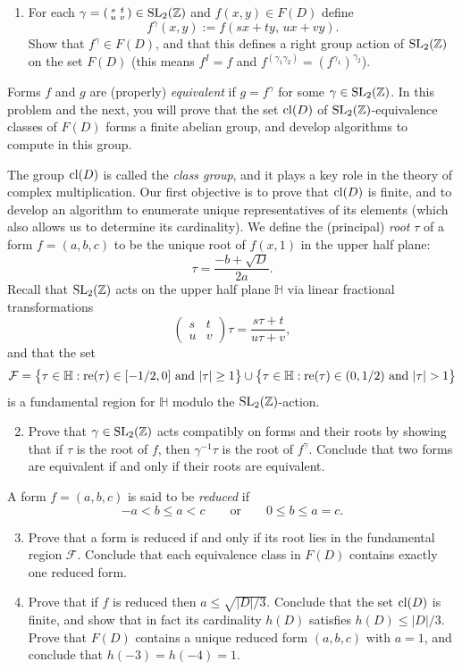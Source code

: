 \documentclass[11pt]{article}
\renewcommand{\H}{\mathbb{H}}
\newcommand{\Z}{\mathbb{Z}}
\newcommand{\re}{\operatorname{re}}
\newcommand{\SL}{{\rm SL}}
\newcommand{\cl}{{\rm cl}}
\theoremstyle{definition}
\begin{document}
\begin{enumerate}[{\bf(a)}]
\item For each $\gamma = \left(\begin{smallmatrix}s&t\\u&v\end{smallmatrix}\right)\in \SL_2(\Z)$ and $f(x,y)\in F(D)$ define
\[
f^\gamma(x,y) := f(sx+ty,\,ux+vy).
\]
Show that $f^\gamma\in F(D)$, and that this defines a right group action of $\SL_2(\Z)$ on the set $F(D)$ (this means $f^I=f$ and $f^{(\gamma_1\gamma_2)}=(f^{\gamma_1})^{\gamma_2}$).
\end{enumerate}

Forms $f$ and $g$ are (properly) \emph{equivalent} if $g=f^\gamma$ for some $\gamma\in\SL_2(\Z)$.
In this problem and the next, you will prove that the set $\cl(D)$ of $\SL_2(\Z)$-equivalence classes of $F(D)$ forms a finite abelian group, and develop algorithms to compute in this group.

The group $\cl(D)$ is called the \emph{class group}, and it plays a key role in the theory of complex multiplication.
Our first objective is to prove that $\cl(D)$ is finite, and to develop an algorithm to enumerate unique representatives of its elements (which also allows us to determine its cardinality).
We define the (principal) \emph{root} $\tau$ of a form $f=(a,b,c)$ to be the unique root of $f(x,1)$ in the upper half plane:
\[
\tau=\frac{-b+\sqrt{D}}{2a}.
\]
Recall that $\SL_2(\Z)$ acts on the upper half plane $\H$ via linear fractional transformations
\[
\begin{pmatrix}s&t\\u&v\end{pmatrix}\tau= \frac{s\tau+t}{u\tau+v},
\]
and that the set
\[
\mathcal{F}=\bigl\{\tau\in\H: \re(\tau)\in[-1/2,0] \text{ and } |\tau|\ge 1\bigr\} \\\cup \bigl\{\tau\in\H: \re(\tau)\in(0,1/2) \text{ and } |\tau|> 1\bigr\}
\]
is a fundamental region for $\H$ modulo the $\SL_2(\Z)$-action.
\begin{enumerate}[{\bf(a)}]
\setcounter{enumi}{1}
\item Prove that $\gamma\in\SL_2(\Z)$ acts compatibly on forms and their roots by showing that if $\tau$ is the root of $f$, then $\gamma^{-1}\tau$ is the root of $f^\gamma$.  Conclude that two forms are equivalent if and only if their roots are equivalent.
\end{enumerate}

A form $f=(a,b,c)$ is said to be \emph{reduced} if
\[
-a<b\le a< c\qquad\text{or}\qquad0\le b \le a = c.
\]
\begin{enumerate}[{\bf(a)}]
\setcounter{enumi}{2}
\item
Prove that a form is reduced if and only if its root lies in the fundamental region $\mathcal{F}$.
Conclude that each equivalence class in $F(D)$ contains exactly one reduced form.
\item
Prove that if $f$ is reduced then $a\le \sqrt{|D|/3}$.  Conclude that the set $\cl(D)$ is finite, and show that in fact its cardinality $h(D)$ satisfies $h(D)\le |D|/3$.  Prove that $F(D)$ contains a unique reduced form $(a,b,c)$ with $a=1$,
and conclude that $h(-3)=h(-4)=1$.
\end{enumerate}
\end{document}
